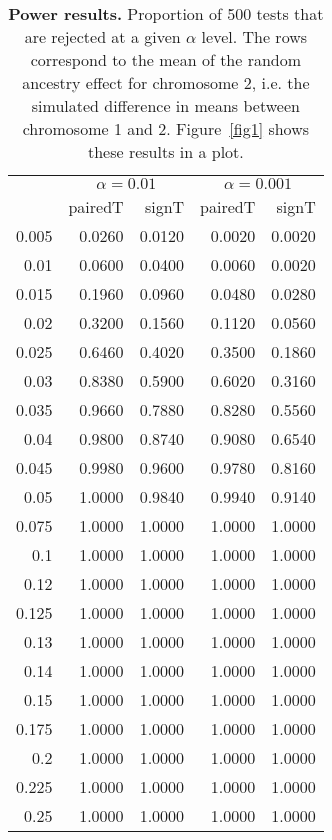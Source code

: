 \documentclass[11pt, letterpaper]{article}
\begin{document}
\begin{table}[ht]
\centering
\begin{tabular}{r|rr|rr}
  \hline
&\multicolumn{2}{c}{$\alpha=0.01$} & \multicolumn{2}{c}{$\alpha=0.001$} \\
 & pairedT & signT & pairedT & signT\\ 
  \hline
0.005 & 0.0260 & 0.0120 & 0.0020 & 0.0020 \\ 
  0.01 & 0.0600 & 0.0400 & 0.0060 & 0.0020 \\ 
  0.015 & 0.1960 & 0.0960 & 0.0480 & 0.0280 \\ 
  0.02 & 0.3200 & 0.1560 & 0.1120 & 0.0560 \\ 
  0.025 & 0.6460 & 0.4020 & 0.3500 & 0.1860 \\ 
  0.03 & 0.8380 & 0.5900 & 0.6020 & 0.3160 \\ 
  0.035 & 0.9660 & 0.7880 & 0.8280 & 0.5560 \\ 
  0.04 & 0.9800 & 0.8740 & 0.9080 & 0.6540 \\ 
  0.045 & 0.9980 & 0.9600 & 0.9780 & 0.8160 \\ 
  0.05 & 1.0000 & 0.9840 & 0.9940 & 0.9140 \\ 
  0.075 & 1.0000 & 1.0000 & 1.0000 & 1.0000 \\ 
  0.1 & 1.0000 & 1.0000 & 1.0000 & 1.0000 \\ 
  0.12 & 1.0000 & 1.0000 & 1.0000 & 1.0000 \\ 
  0.125 & 1.0000 & 1.0000 & 1.0000 & 1.0000 \\ 
  0.13 & 1.0000 & 1.0000 & 1.0000 & 1.0000 \\ 
  0.14 & 1.0000 & 1.0000 & 1.0000 & 1.0000 \\ 
  0.15 & 1.0000 & 1.0000 & 1.0000 & 1.0000 \\ 
  0.175 & 1.0000 & 1.0000 & 1.0000 & 1.0000 \\ 
  0.2 & 1.0000 & 1.0000 & 1.0000 & 1.0000 \\ 
  0.225 & 1.0000 & 1.0000 & 1.0000 & 1.0000 \\ 
  0.25 & 1.0000 & 1.0000 & 1.0000 & 1.0000 \\ 
   \hline
\end{tabular}
\caption{\textbf{Power results.} Proportion of 500 tests that are rejected at a given $\alpha$ level. The rows correspond to the mean of the random ancestry effect for chromosome 2, i.e. the simulated difference in means between chromosome 1 and 2. Figure~\ref{fig1} shows these results in a plot.}
\label{tab1}
\end{table}
\end{document}
